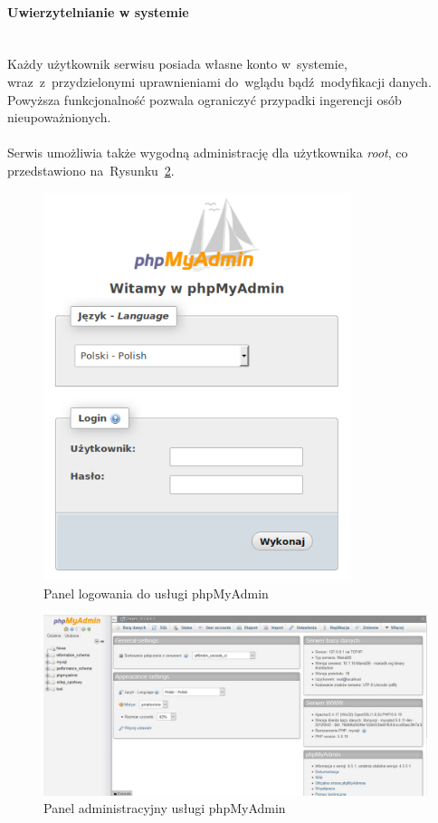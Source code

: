 \documentclass[a4paper, 12pt]{article}
\begin{document}
\paragraph{Uwierzytelnianie w systemie} \mbox{}\\
Każdy użytkownik serwisu posiada własne konto w~systemie, wraz~z~przydzielonymi uprawnieniami do~wglądu bądź~modyfikacji danych.
Powyższa funkcjonalność pozwala ograniczyć przypadki ingerencji osób nieupoważnionych.\\\\
Serwis umożliwia także wygodną administrację dla użytkownika \textit{root}, co przedstawiono na~Rysunku~\ref{fig:phpMyAdmin}.

\begin{figure}[H]
	\centering
	\includegraphics[width=9cm]{phpMyAdmin_login.png}
	\caption[Panel logowania do phpMyAdmin]{Panel logowania do usługi phpMyAdmin}
	\label{fig:logowanieDophpMyAdmin}
\end{figure}

\begin{figure}[H]
	\centering
	\includegraphics[width=15cm]{phpmyadmin.jpg}
	\caption[Panel administracyjny usługi phpMyAdmin]{Panel administracyjny usługi phpMyAdmin}
	\label{fig:phpMyAdmin}
\end{figure}
\end{document}

